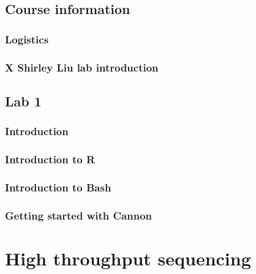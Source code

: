 \documentclass[
]{book}
\begin{document}
\hypertarget{course-information-1}{%
\section{Course information}\label{course-information-1}}

\hypertarget{logistics}{%
\subsection{Logistics}\label{logistics}}

\hypertarget{x-shirley-liu-lab-introduction}{%
\subsection{X Shirley Liu lab introduction}\label{x-shirley-liu-lab-introduction}}

\hypertarget{lab-1}{%
\section{Lab 1}\label{lab-1}}

\hypertarget{introduction}{%
\subsection{Introduction}\label{introduction}}

\hypertarget{introduction-to-r}{%
\subsection{Introduction to R}\label{introduction-to-r}}

\hypertarget{introduction-to-bash}{%
\subsection{Introduction to Bash}\label{introduction-to-bash}}

\hypertarget{getting-started-with-cannon}{%
\subsection{Getting started with Cannon}\label{getting-started-with-cannon}}

\hypertarget{ngs}{%
\chapter{High throughput sequencing}\label{ngs}}
\end{document}

